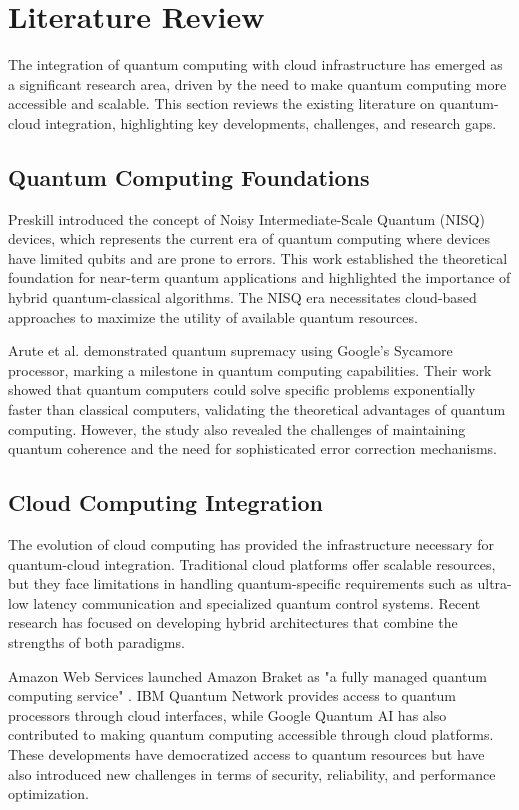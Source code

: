 \documentclass[onecolumn]{IEEEtran}
\begin{document}
\section{Literature Review}

The integration of quantum computing with cloud infrastructure has emerged as a significant research area, driven by the need to make quantum computing more accessible and scalable. This section reviews the existing literature on quantum-cloud integration, highlighting key developments, challenges, and research gaps.

\subsection{Quantum Computing Foundations}

Preskill \cite{preskill2018} introduced the concept of Noisy Intermediate-Scale Quantum (NISQ) devices, which represents the current era of quantum computing where devices have limited qubits and are prone to errors. This work established the theoretical foundation for near-term quantum applications and highlighted the importance of hybrid quantum-classical algorithms. The NISQ era necessitates cloud-based approaches to maximize the utility of available quantum resources.

Arute et al. \cite{arute2019} demonstrated quantum supremacy using Google's Sycamore processor, marking a milestone in quantum computing capabilities. Their work showed that quantum computers could solve specific problems exponentially faster than classical computers, validating the theoretical advantages of quantum computing. However, the study also revealed the challenges of maintaining quantum coherence and the need for sophisticated error correction mechanisms.

\subsection{Cloud Computing Integration}

The evolution of cloud computing has provided the infrastructure necessary for quantum-cloud integration. Traditional cloud platforms offer scalable resources, but they face limitations in handling quantum-specific requirements such as ultra-low latency communication and specialized quantum control systems. Recent research has focused on developing hybrid architectures that combine the strengths of both paradigms.

Amazon Web Services launched Amazon Braket as "a fully managed quantum computing service" \cite{aws_braket}. IBM Quantum Network \cite{ibm_quantum} provides access to quantum processors through cloud interfaces, while Google Quantum AI \cite{google_quantum} has also contributed to making quantum computing accessible through cloud platforms. These developments have democratized access to quantum resources but have also introduced new challenges in terms of security, reliability, and performance optimization.
\end{document}

